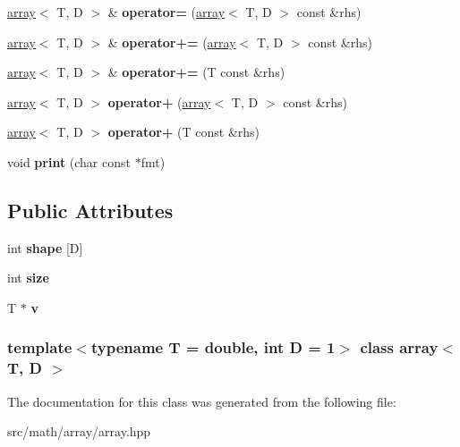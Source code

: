 \begin{DoxyCompactItemize}
\item 
\hypertarget{classarray_ae6ce8cec926e8422a243f9d189296265}{
\hyperlink{classarray}{array}$<$ T, D $>$ \& {\bfseries operator=} (\hyperlink{classarray}{array}$<$ T, D $>$ const \&rhs)}
\label{classarray_ae6ce8cec926e8422a243f9d189296265}

\item 
\hypertarget{classarray_af1ee5ea8e9a153ffc26a513e442916a1}{
\hyperlink{classarray}{array}$<$ T, D $>$ \& {\bfseries operator+=} (\hyperlink{classarray}{array}$<$ T, D $>$ const \&rhs)}
\label{classarray_af1ee5ea8e9a153ffc26a513e442916a1}

\item 
\hypertarget{classarray_a707d31f0cd68cf8c29578ceeffd4f160}{
\hyperlink{classarray}{array}$<$ T, D $>$ \& {\bfseries operator+=} (T const \&rhs)}
\label{classarray_a707d31f0cd68cf8c29578ceeffd4f160}

\item 
\hypertarget{classarray_ad2d3f9c01dd2e53e0575f25d99fa5332}{
\hyperlink{classarray}{array}$<$ T, D $>$ {\bfseries operator+} (\hyperlink{classarray}{array}$<$ T, D $>$ const \&rhs)}
\label{classarray_ad2d3f9c01dd2e53e0575f25d99fa5332}

\item 
\hypertarget{classarray_aa8116676705ae21a643f3fa6fbfc8d16}{
\hyperlink{classarray}{array}$<$ T, D $>$ {\bfseries operator+} (T const \&rhs)}
\label{classarray_aa8116676705ae21a643f3fa6fbfc8d16}

\item 
\hypertarget{classarray_afaaffd8caa1ff3e9b0c676bce63b4620}{
void {\bfseries print} (char const $\ast$fmt)}
\label{classarray_afaaffd8caa1ff3e9b0c676bce63b4620}

\end{DoxyCompactItemize}
\subsection*{Public Attributes}
\begin{DoxyCompactItemize}
\item 
\hypertarget{classarray_a26bbf20751fa00968b42384186ffa1f0}{
int {\bfseries shape} \mbox{[}D\mbox{]}}
\label{classarray_a26bbf20751fa00968b42384186ffa1f0}

\item 
\hypertarget{classarray_aece99778954bbd58c36a3ca2a1eb6122}{
int {\bfseries size}}
\label{classarray_aece99778954bbd58c36a3ca2a1eb6122}

\item 
\hypertarget{classarray_ac0f2991b5e69fca9e7b8882b6910492a}{
T $\ast$ {\bfseries v}}
\label{classarray_ac0f2991b5e69fca9e7b8882b6910492a}

\end{DoxyCompactItemize}
\subsubsection*{template$<$typename T = double, int D = 1$>$ class array$<$ T, D $>$}



The documentation for this class was generated from the following file:\begin{DoxyCompactItemize}
\item 
src/math/array/array.hpp\end{DoxyCompactItemize}
